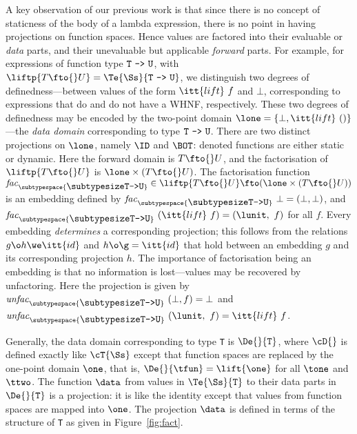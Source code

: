 \begin{article}
A key observation of our previous work
\cite{Dav93b} is that since there is no concept
of staticness of the body of a lambda expression, there is no point in
having projections on function spaces.  Hence values are factored into
their evaluable or {\it data\/} parts, and their unevaluable but
applicable {\it forward\/} parts.  For example, for expressions of
function type ${\mbox{\tt T}\ \mbox{\tt ->}\ \mbox{\tt U}}$, with
$\liftp{T\fto{}U}=\Te{\Ss}{\mbox{\tt T}\ \mbox{\tt ->}\ \mbox{\tt U}}$, we distinguish two
degrees of definedness---between values of the form
$\itt{lift}~f$ and $\bot$, corresponding to expressions that do and
do not have a WHNF, respectively.  These two degrees of definedness 
may be encoded by the two-point
domain $\lone=\{\bot, \itt{lift}~()\}$---the {\it data domain\/} corresponding
to type ${\mbox{\tt T}\ \mbox{\tt ->}\ \mbox{\tt U}}$.  There are two distinct projections on $\lone$,
namely $\ID$ and $\BOT$: denoted functions are 
either static or dynamic.  Here 
the forward domain is $T\fto{}U$, and the factorisation of $\liftp{T\fto{}U}$
is $\lone\times(T\fto{}U)$.  The factorisation function
${\it{}fac}_{\subtypespace{\makebox{\subtypesize\tt T->U}} }\in\liftp{T\fto{}U}\fto(\lone\times(T\fto{}U))$
is an embedding defined by
${\it{}fac}_{\subtypespace{\makebox{\subtypesize\tt T->U}} }~\bot=(\bot,\bot)$, and
${\it{}fac}_{\subtypespace{\makebox{\subtypesize\tt T->U}} }~(\itt{lift}~f)=(\lunit,~f)$ for all $f$.
Every embedding {\it determines\/} a corresponding projection; 
this follows from the relations $g\o h\we\itt{id}$ and $h\o\g=\itt{id}$
that hold between an embedding $g$ and its corresponding projection $h$.
The importance of factorisation being an embedding is that no information
is lost---values may be recovered by unfactoring.  Here the
projection is given by
${\it{}unfac}_{\subtypespace{\makebox{\subtypesize\tt T->U}} }~(\bot,f)=\bot$ and
${\it{}unfac}_{\subtypespace{\makebox{\subtypesize\tt T->U}} }~(\lunit,~f)=\itt{lift}~f$.

Generally, the data domain corresponding to type \mbox{\tt T} is $\De{}{\mbox{\tt T}}$,
where $\cD{}$ is defined exactly like $\cT{\Ss}$ except that function
spaces are replaced by the one-point domain $\one$, that is,
$\De{}{\tfun}=\lift{\one}$ for all $\tone$ and $\ttwo$.  
The function $\data$ from values in
$\Te{\Ss}{\mbox{\tt T}}$ to their data parts in $\De{}{\mbox{\tt T}}$ is a projection:
it is like the identity except that values from function spaces are
mapped into $\one$.  The projection $\data$ is defined in terms of the
structure of \mbox{\tt T} as given in Figure~\ref{fig:fact}.
\end{article}
